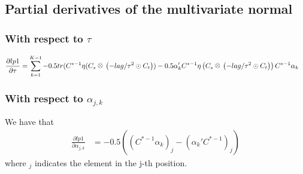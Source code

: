 \documentclass[12pt]{article}
\newcommand{\kron}{\raisebox{1pt}{\ensuremath{\:\otimes\:}}}
\begin{document}
\subsection{Partial derivatives of the multivariate normal}

\subsubsection{With respect to $\tau$}

\begin{align*}
\frac{ \partial lp1 }{ \partial \tau } &= \sum_{k=1}^{K-1} -0.5 tr(C^{* -1} \eta (C_s \kron \left(-lag/\tau^2 \odot C_t \right)) - 0.5 \alpha_k' C^{* -1} \eta \left(C_s \kron \left( -lag/\tau^2 \odot C_t \right) \right) C^{* -1} \alpha_k 
\end{align*}

\subsubsection{With respect to $\alpha_{j,k}$}

We have that
\begin{align*}
\frac{ \partial lp1 }{ \partial \alpha_{j,k} } &= -0.5 \left( (C^{* -1} \alpha_k)_{j} - (\alpha_k' C^{* -1})_{j} \right)
\end{align*}
where $_j$ indicates the element in the j-th position.




\end{document}
